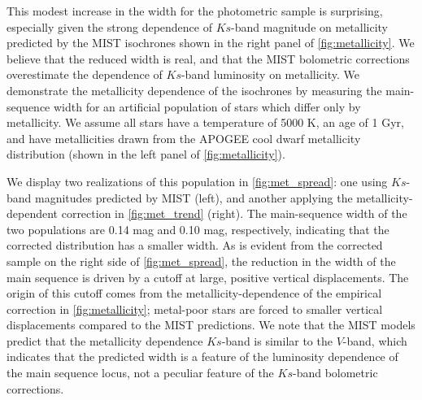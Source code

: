 \documentclass[twocolumn]{aastex6}
\begin{document}
\begin{figure*}[htb]
    \centering
    \caption{\emph{Left:} The distribution of vertical displacements imposed
    by the metallicity distribution of the APOGEE sample using the raw MIST
    isochrones. All stars are assumed to have a known temperature of 5000 K. 
    Not shown are two very metal-poor stars which are off the plot to the 
    right. \emph{Right:} Same as the left, except the MIST \(Ks\)-band 
    magnitudes are corrected by the empirical correction in
\cref{fig:met_trend} and the two most metal-poor stars are off the figure to
the left.}\label{fig:met_spread}
\end{figure*}

This modest increase in the width for the photometric sample is surprising,
especially given the strong dependence of \(Ks\)-band magnitude on metallicity 
predicted by the MIST isochrones shown in the right panel of 
\cref{fig:metallicity}. We believe that the reduced width is real, and that 
the MIST bolometric corrections overestimate the dependence of \(Ks\)-band 
luminosity on metallicity. We demonstrate the metallicity dependence of 
the isochrones by measuring the 
main-sequence width for an artificial population of stars which 
differ only by metallicity. We assume all stars have a temperature of 5000 K, 
an age of 1 Gyr, and have metallicities drawn from the APOGEE cool dwarf 
metallicity distribution (shown in the left panel of \cref{fig:metallicity}).

We display two realizations of this population in \cref{fig:met_spread}: one
using \(Ks\)-band magnitudes predicted by MIST (left), and another applying the
metallicity-dependent correction in \cref{fig:met_trend} (right).
The main-sequence width of the two populations are 0.14 mag and 0.10 mag, 
respectively, indicating that the corrected distribution has a smaller width. 
As is evident from the corrected sample on the right side of 
\cref{fig:met_spread}, the reduction in the width of the main 
sequence is driven by a cutoff at large, positive vertical displacements.
The origin of this cutoff comes from the metallicity-dependence of the empirical 
correction in \cref{fig:metallicity}; metal-poor stars are forced to smaller 
vertical displacements compared to the MIST predictions. We note that the MIST 
models predict that the metallicity dependence \(Ks\)-band is similar to the
\(V\)-band, which indicates that the predicted width is a feature of the 
luminosity dependence of the main sequence locus, not a peculiar feature of 
the \(Ks\)-band bolometric corrections.  
\end{document}
